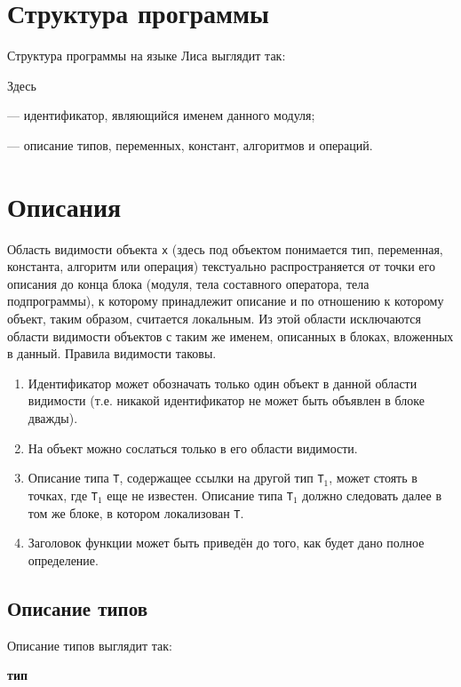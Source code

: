\documentclass[10pt]{report}
\begin{document}
    \section{Структура программы}
Структура программы на языке Лиса выглядит так:


Здесь

\noindent\textcolor{Green}{} --- идентификатор, являющийся именем данного модуля;

\noindent\textcolor{Green}{} --- описание типов, переменных, констант, алгоритмов и операций.


    \section{Описания}

Область видимости объекта \texttt{x} (здесь под объектом понимается тип, переменная, константа, алгоритм или операция) текстуально распространяется от точки его описания до
конца блока (модуля, тела составного оператора, тела подпрограммы), к которому принадлежит описание и по отношению к которому объект, таким образом, считается локальным. Из
этой области исключаются области видимости объектов с таким же именем, описанных в блоках, вложенных в данный. Правила видимости таковы.
\begin{enumerate}
    \item Идентификатор может обозначать только один объект в данной области видимости (т.е. никакой идентификатор не может быть объявлен в блоке дважды).
    \item На объект можно сослаться только в его области видимости.
    \item Описание типа \texttt{T}, содержащее ссылки на другой тип \texttt{T}$_1$, может стоять в точках, где \texttt{T}$_1$ еще не известен. Описание типа \texttt{T}$_1$
должно следовать далее в том же блоке, в котором локализован \texttt{T}.
    \item Заголовок функции может быть приведён до того, как будет дано полное определение.
\end{enumerate}

        \subsection{Описание типов}
Описание типов выглядит так:
\begin{center}
\noindent\textbf{тип} \textcolor{Green}{}
\end{center}
\end{document}
